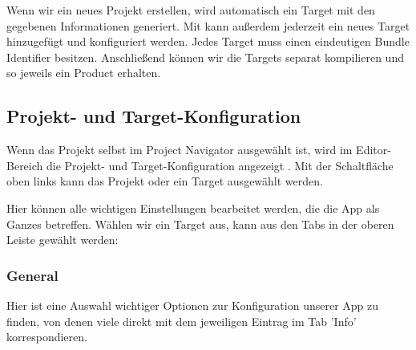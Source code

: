 \documentclass[parskip=half, final]{scrreprt}
\begin{document}
Wenn wir ein neues Projekt erstellen, wird automatisch ein Target mit den gegebenen Informationen generiert. Mit  kann außerdem jederzeit ein neues Target hinzugefügt und konfiguriert werden. Jedes Target muss einen eindeutigen Bundle Identifier besitzen. Anschließend können wir die Targets separat kompilieren und so jeweils ein Product erhalten.

\subsection{Projekt- und Target-Konfiguration}\label{sec:projkonfig}

Wenn das Projekt selbst im Project Navigator  ausgewählt ist, wird im Editor-Bereich die Projekt- und Target-Konfiguration angezeigt . Mit der Schaltfläche oben links kann das Projekt oder ein Target ausgewählt werden.


Hier können alle wichtigen Einstellungen bearbeitet werden, die die App als Ganzes betreffen. Wählen wir ein Target aus, kann aus den Tabs in der oberen Leiste gewählt werden:

\subsubsection{General}

Hier ist eine Auswahl wichtiger Optionen zur Konfiguration unserer App zu finden, von denen viele direkt mit dem jeweiligen Eintrag im Tab 'Info' korrespondieren.
\end{document}
